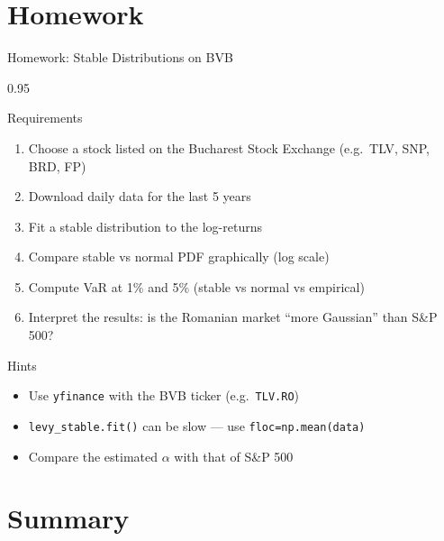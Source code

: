 \documentclass[9pt, aspectratio=169, t]{beamer}
\begin{document}
\section{Homework}

\begin{frame}{Homework: Stable Distributions on BVB}
    \begin{cminipage}{0.95\textwidth}
\begin{block}{Requirements}
\begin{enumerate}\setlength{\itemsep}{0pt}
    \item Choose a stock listed on the Bucharest Stock Exchange (e.g.\ TLV, SNP, BRD, FP)
    \item Download daily data for the last 5 years
    \item Fit a stable distribution to the log-returns
    \item Compare stable vs normal PDF graphically (log scale)
    \item Compute VaR at 1\% and 5\% (stable vs normal vs empirical)
    \item Interpret the results: is the Romanian market ``more Gaussian'' than S\&P 500?
\end{enumerate}
\end{block}

\vspace{0.2cm}
\begin{exampleblock}{Hints}
\begin{itemize}\setlength{\itemsep}{0pt}
    \item Use \texttt{yfinance} with the BVB ticker (e.g.\ \texttt{TLV.RO})
    \item \texttt{levy\_stable.fit()} can be slow --- use \texttt{floc=np.mean(data)}
    \item Compare the estimated $\alpha$ with that of S\&P 500
\end{itemize}
\end{exampleblock}
    \end{cminipage}
\end{frame}

\section{Summary}
\end{document}
